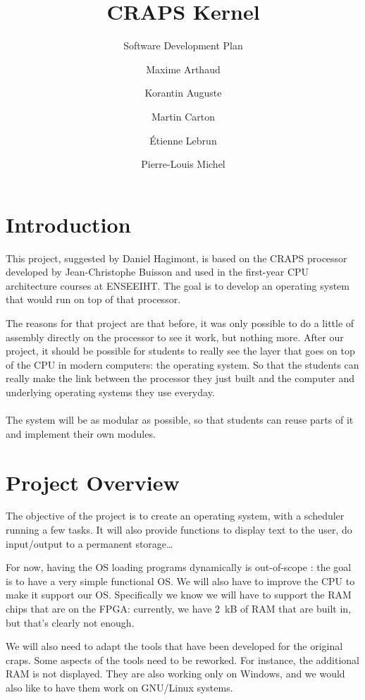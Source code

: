 \documentclass{article}
\title{CRAPS Kernel}
\subtitle{Software Development Plan}
\author{
       Maxime Arthaud
  \and Korantin Auguste
  \and Martin Carton
  \and Étienne Lebrun
  \and Pierre-Louis Michel
}
\begin{document}
  
  \tableofcontents
  \newpage

  \section{Introduction}
    This project, suggested by Daniel Hagimont, is based on the CRAPS processor
    developed by Jean-Christophe Buisson and used in the first-year CPU
    architecture courses at ENSEEIHT. The goal is to develop an operating
    system that would run on top of that processor.

    The reasons for that project are that before, it was only possible to do a
    little of assembly directly on the processor to see it work, but nothing
    more.  After our project, it should be possible for students to really see
    the layer that goes on top of the CPU in modern computers: the operating
    system. So that the students can really make the link between the processor
    they just built and the computer and underlying operating systems they use
    everyday.

    \paragraph{}
    The system will be as modular as possible, so that students can reuse parts
    of it and implement their own modules.

  \section{Project Overview}
    The objective of the project is to create an operating system, with a
    scheduler running a few tasks. It will also provide functions to display
    text to the user, do input/output to a permanent storage\dots

    For now, having the OS loading programs dynamically is out-of-scope : the
    goal is to have a very simple functional OS.  We will also have to improve
    the CPU to make it support our OS. Specifically we know we will have to
    support the RAM chips that are on the FPGA: currently, we have \SI{2}{kB}
    of RAM that are built in, but that's clearly not enough.

    We will also need to adapt the tools that have been developed for the
    original craps. Some aspects of the tools need to be reworked. For
    instance, the additional RAM is not displayed. They are also working
    only on Windows, and we would also like to have them work on GNU/Linux systems.
    
\end{document}
